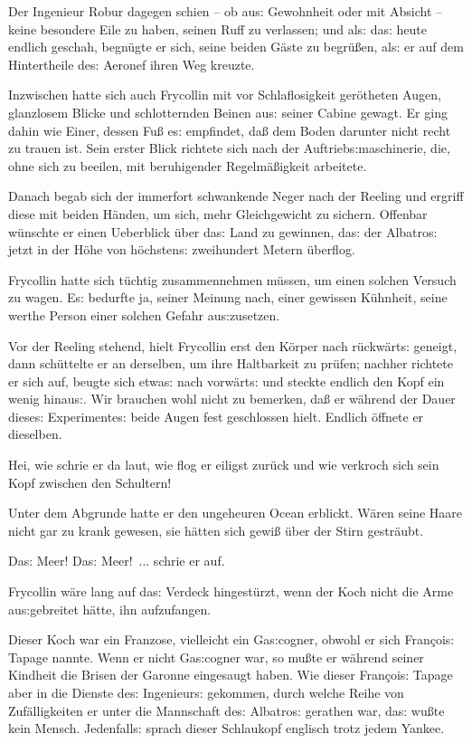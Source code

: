 \documentclass[oneside,12pt]{book}
\newcommand{\s}{s:}
\begin{document}
Der Ingenieur Robur dagegen schien -- ob au{\s} Gewohnheit oder mit
Absicht -- keine besondere Eile zu haben, seinen Ruff zu verlassen;
und al{\s} da{\s} heute endlich geschah, begn\"ugte er sich, seine
beiden G\"aste zu begr\"u{\ss}en, al{\s} er auf dem Hintertheile
de{\s} Aeronef ihren Weg kreuzte.

Inzwischen hatte sich auch Frycollin mit vor Schlaflosigkeit
ger\"otheten Augen, glanzlosem Blicke und schlotternden Beinen au{\s}
seiner Cabine gewagt. Er ging dahin wie Einer, dessen Fu{\ss} e{\s}
empfindet, da{\ss} dem Boden darunter nicht recht zu trauen ist. Sein
erster Blick richtete sich nach der Auftrieb{\s}maschinerie, die,
ohne sich zu beeilen, mit beruhigender Regelm\"a{\ss}igkeit
arbeitete.

Danach begab sich der immerfort schwankende Neger nach der Reeling
und ergriff diese mit beiden H\"anden, um sich, mehr Gleichgewicht zu
sichern. Offenbar w\"unschte er einen Ueberblick \"uber da{\s} Land
zu gewinnen, da{\s} der {\glqq}Albatro{\s}{\grqq} jetzt in der H\"ohe
von h\"ochsten{\s} zweihundert Metern \"uberflog.

Frycollin hatte sich t\"uchtig zusammennehmen m\"ussen, um einen
solchen Versuch zu wagen. E{\s} bedurfte ja, seiner Meinung nach,
einer gewissen K\"uhnheit, seine werthe Person einer solchen Gefahr
au{\s}zusetzen.

Vor der Reeling stehend, hielt Frycollin erst den K\"orper nach
r\"uckw\"art{\s} geneigt, dann sch\"uttelte er an derselben, um ihre
Haltbarkeit zu pr\"ufen; nachher richtete er sich auf, beugte sich
etwa{\s} nach vorw\"art{\s} und steckte endlich den Kopf ein wenig
hinau{\s}. Wir brauchen wohl nicht zu bemerken, da{\ss} er w\"ahrend
der Dauer diese{\s} Experimente{\s} beide Augen fest geschlossen
hielt. Endlich \"offnete er dieselben.

Hei, wie schrie er da laut, wie flog er eiligst zur\"uck und wie
verkroch sich sein Kopf zwischen den Schultern!

Unter dem Abgrunde hatte er den ungeheuren Ocean erblickt. W\"aren
seine Haare nicht gar zu krank gewesen, sie h\"atten sich gewi{\ss}
\"uber der Stirn gestr\"aubt.

{\glqq}Da{\s} Meer! Da{\s} Meer!~...{\grqq} schrie er auf.

Frycollin w\"are lang auf da{\s} Verdeck hingest\"urzt, wenn der Koch
nicht die Arme au{\s}gebreitet h\"atte, ihn aufzufangen.

Dieser Koch war ein Franzose, vielleicht ein Ga{\s}cogner, obwohl er
sich Fran\c{c}oi{\s} Tapage nannte. Wenn er nicht Ga{\s}cogner war,
so mu{\ss}te er w\"ahrend seiner Kindheit die Brisen der Garonne
eingesaugt haben. Wie dieser Fran\c{c}oi{\s} Tapage aber in die
Dienste de{\s} Ingenieur{\s} gekommen, durch welche Reihe von
Zuf\"alligkeiten er unter die Mannschaft de{\s}
{\glqq}Albatro{\s}{\grqq} gerathen war, da{\s} wu{\ss}te kein Mensch.
Jedenfall{\s} sprach dieser Schlaukopf englisch trotz jedem Yankee.
\end{document}
